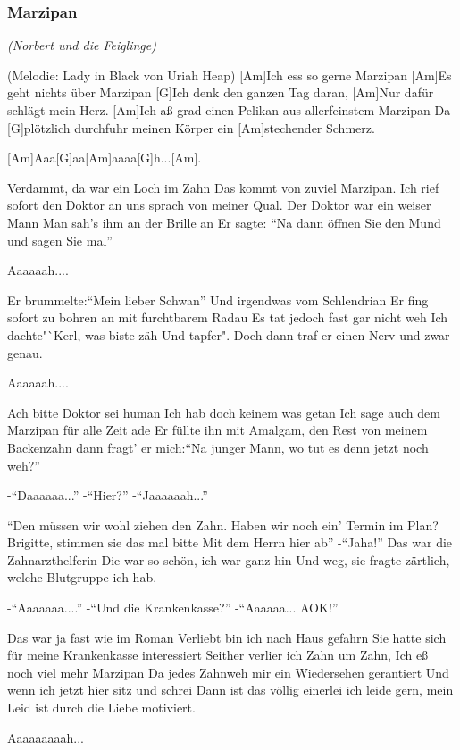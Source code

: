 \documentclass[a5paper,pagesize,twoside,10pt,headings=small]{scrartcl}
\newcommand\songheader[3][]{%
    \subsubsection*{\centering #2}\vspace{0.5\baselineskip}%
    \addcontentsline{toc}{subsection}{#2}
    \centering \textit{#3}\\%
    \vspace{\baselineskip}\par%
}
\newenvironment{myguitar}{\begin{guitar}}{\clearpage\end{guitar}}
\begin{document}
\songheader{Marzipan}{(Norbert und die Feiglinge)}
\begin{myguitar}
{\tiny(Melodie: Lady in Black von Uriah Heap)}
[Am]Ich ess so gerne Marzipan
[Am]Es geht nichts über Marzipan
[G]Ich denk den ganzen Tag daran,
[Am]Nur dafür schlägt mein Herz.
[Am]Ich aß grad einen Pelikan aus allerfeinstem Marzipan
Da [G]plötzlich durchfuhr meinen Körper ein [Am]stechender Schmerz.

[Am]Aaa[G]aa[Am]aaaa[G]h...[Am].

Verdammt, da war ein Loch im Zahn
Das kommt von zuviel Marzipan.
Ich rief sofort den Doktor an uns sprach von meiner Qual.
Der Doktor war ein weiser Mann
Man sah's ihm an der Brille an
Er sagte: "`Na dann öffnen Sie den Mund und sagen Sie mal"'

Aaaaaah....

Er brummelte:"`Mein lieber Schwan"'
Und irgendwas vom Schlendrian
Er fing sofort zu bohren an mit furchtbarem Radau
Es tat jedoch fast gar nicht weh
Ich dachte"`Kerl, was biste zäh
Und tapfer". Doch dann traf er einen Nerv und zwar genau.

Aaaaaah....

Ach bitte Doktor sei human
Ich hab doch keinem was getan
Ich sage auch dem Marzipan für alle Zeit ade
Er füllte ihn mit Amalgam, den Rest von meinem Backenzahn
dann fragt' er mich:"`Na junger Mann, wo tut es denn jetzt noch weh?"'

-"`Daaaaaa..."'
-"`Hier?"'
-"`Jaaaaaah..."'

"`Den müssen wir wohl ziehen den Zahn.
Haben wir noch ein' Termin im Plan?
Brigitte, stimmen sie das mal bitte
Mit dem Herrn hier ab"' -"`Jaha!"'
Das war die Zahnarzthelferin
Die war so schön, ich war ganz hin
Und weg, sie fragte zärtlich, welche Blutgruppe ich hab.

-"`Aaaaaaa...."'
-"`Und die Krankenkasse?"'
-"`Aaaaaa... AOK!"'

Das war ja fast wie im Roman
Verliebt bin ich nach Haus gefahrn
Sie hatte sich für meine Krankenkasse interessiert
Seither verlier ich Zahn um Zahn,
Ich eß noch viel mehr Marzipan
Da jedes Zahnweh mir ein Wiedersehen gerantiert
Und wenn ich jetzt hier sitz und schrei
Dann ist das völlig einerlei
ich leide gern, mein Leid ist durch die Liebe motiviert.

Aaaaaaaaah...
\end{myguitar}
\end{document}

